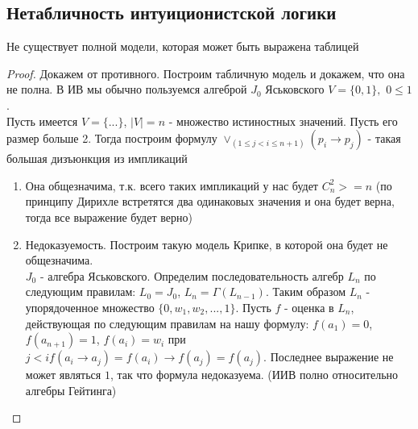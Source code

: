 \subsection{Нетабличность интуиционистской логики}
\begin{theorem}
Не существует полной модели, которая может быть выражена таблицей 
\end{theorem}
\begin{proof}
Докажем от противного. Построим табличную модель и докажем, что она не полна. В ИВ мы обычно пользуемся алгеброй $J_{0}$ Яськовского $V = \lbrace 0, 1 \rbrace,$ $0 \leq 1$.\\
Пусть имеется $V = \lbrace ... \rbrace$, $\vert V \vert = n$ - множество истиностных значений. Пусть его размер больше 2. Тогда построим формулу $\vee_{(1 \leq j < i \leq n + 1)}(p_{i} \rightarrow p_{j})$ - такая большая дизъюнкция из импликаций
\begin{enumerate}
\item Она общезначима, т.к. всего таких импликаций у нас будет $C_{n}^{2} >= n$ (по принципу Дирихле встретятся два одинаковых значения и она будет верна, тогда все выражение будет верно)
\item Недоказуемость. Построим такую модель Крипке, в которой она будет не общезначима.\\
$J_{0}$ - алгебра Яськовского. Определим последовательность алгебр $L_{n}$ по следующим правилам: $L_{0} = J_{0}$, $L_{n} = \Gamma(L_{n - 1})$. Таким образом $L_{n}$ - упорядоченное множество $\lbrace 0, w_{1}, w_{2}, ..., 1 \rbrace$. Пусть $f$ - оценка в $L_{n}$, действующая по следующим правилам на нашу формулу: $f(a_{1}) = 0$, $f(a_{n+1}) = 1$, $f(a_{i}) = w_{i}$ при $j < i f(a_{i} \rightarrow a_{j}) = f(a_{i}) \rightarrow f(a_{j}) = f(a_{j})$. Последнее выражение не может являться $1$, так что формула недоказуема. (ИИВ полно относительно алгебры Гейтинга)
\end{enumerate}
\end{proof}
